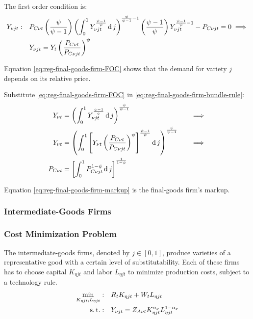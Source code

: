 \documentclass[
	thesis.tex
	]{subfiles}
\begin{document}
The first order condition is:
\begin{align}
	Y_{\nu jt}:\quad & P_{C\nu t} \left( \frac{\psi}{\psi-1} \right) \left( \int_{0}^{1} Y_{\nu jt}^{\frac{\psi-1}{\psi}} \operatorname{d} j \right)^{\frac{\psi}{\psi-1}-1} \left( \frac{\psi-1}{\psi} \right) Y_{\nu jt}^{\frac{\psi-1}{\psi}-1} - P_{C\nu jt} = 0 \implies \nonumber \\
	\label{eq:reg-final-goods-firm-FOC}
	& Y_{\nu jt} = Y_t \left( \frac{P_{C\nu t}}{P_{C\nu jt}} \right)^{\psi}
\end{align}

Equation \ref{eq:reg-final-goods-firm-FOC} shows that the demand for variety $j$ depends on its relative price. 

Substitute \ref{eq:reg-final-goods-firm-FOC} in \ref{eq:reg-final-goods-firm-bundle-rule}:
\begin{alignat}{2}
	Y_{\nu t} & = \left( \int_{0}^{1} Y_{\nu jt}^{\frac{\psi-1}{\psi}} \operatorname{d} j \right)^{\frac{\psi}{\psi-1}} &\implies \nonumber \\
	Y_{\nu t} & = \left( \int_{0}^{1} \left[ Y_{\nu t} \left( \frac{P_{C\nu t}}{P_{C\nu jt}} \right)^{\psi} \right]^{\frac{\psi-1}{\psi}} \operatorname{d} j \right)^{\frac{\psi}{\psi-1}} \quad &\implies \nonumber \\
	P_{C\nu t} & = \left[ \int_{0}^{1} P_{C\nu jt}^{1-\psi} \operatorname{d} j \right]^{\frac{1}{1-\psi}} \label{eq:reg-final-goods-firm-markup}
\end{alignat}

Equation \ref{eq:reg-final-goods-firm-markup} is the final-goods firm's markup.


\subsubsection{Intermediate-Goods Firms}

\subsubsection*{Cost Minimization Problem}

The intermediate-goods firms, denoted by $j \in [0,1]$, produce varieties of a representative good with a certain level of substitutability. Each of these firms has to choose capital $K_{\eta jt}$ and labor $L_{\eta jt}$ to minimize production costs, subject to a technology rule.
\begin{align}
	\label{eq:reg-int-good-firm-total-cost}
	\min_{K_{\eta jt}, L_{\eta jt}}: \quad & R_t K_{\eta jt} + W_t L_{\eta jt} \\
	\label{eq:reg-int-good-firm-production-function}
	\operatorname{s.t.}: \quad & Y_{\nu jt} = Z_{A\nu t} K_{\eta jt}^{\alpha_\nu} L_{\eta jt}^{1-{\alpha_\nu}}
\end{align}
\end{document}
